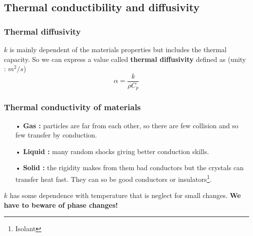  		\subsection{Thermal conductibility and diffusivity}
			\subsubsection{Thermal diffusivity} 	
	 			$k$ is mainly dependent of the materials properties but includes the thermal capacity. So we can express a value called \textbf{thermal diffusivity} defined as (unity : $m^2/s$)
 				\begin{equation}
 					\alpha = \frac{k}{\rho C_p}
 					\label{eq:3.7}
 				\end{equation}
 			
	 		\subsubsection{Thermal conductivity of materials}
	 			\begin{itemize}
	 				\item[•] \textbf{Gas :} particles are far from each other, so there are few collision and so few transfer by conduction. 
	 				\item[•] \textbf{Liquid :} many random shocks giving better conduction skills. 
	 				\item[•] \textbf{Solid :} the rigidity makes from them bad conductors but the crystals can transfer heat fast. They can so be good conductors or insulators\footnote{Isolant}. \\
	 			\end{itemize}
	 			
	 			$k$ has some dependence with temperature that is neglect for small changes. \textbf{We have to beware of phase changes!}
	 			
